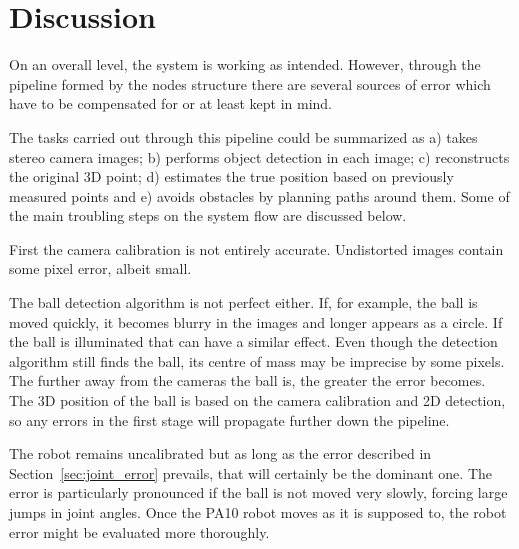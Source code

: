 \chapter{Discussion}
\label{chap:discussion}
On an overall level, the system is working as intended. 
However, through the pipeline formed by the nodes structure there are several sources of error which have to be compensated for or at least kept in mind.

The tasks carried out through this pipeline could be summarized as a) takes stereo camera images; b) performs object detection in each image; c) reconstructs the original 3D point; d) estimates the true position based on previously measured points and e) avoids obstacles by planning paths around them.
Some of the main troubling steps on the system flow are discussed below.

First the camera calibration is not entirely accurate.
Undistorted images contain some pixel error, albeit small.

The ball detection algorithm is not perfect either.
If, for example, the ball is moved quickly, it becomes blurry in the images and longer appears as a circle.
If the ball is illuminated that can have a similar effect.
Even though the detection algorithm still finds the ball, its centre of mass may be imprecise by some pixels.
The further away from the cameras the ball is, the greater the error becomes.
The 3D position of the ball is based on the camera calibration and 2D detection, so any errors in the first stage will propagate further down the pipeline.

The robot remains uncalibrated but as long as the error described in Section~\ref{sec:joint_error} prevails, that will certainly be the dominant one. The error is particularly pronounced if the ball is not moved very slowly, forcing large jumps in joint angles. Once the PA10 robot moves as it is supposed to, the robot error might be evaluated more thoroughly.

